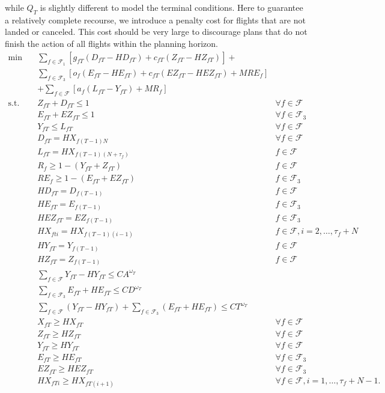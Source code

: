 \documentclass[12pt]{article}
\begin{document}
	while \(Q_T\) is slightly different to model the terminal conditions. Here to guarantee a relatively complete recourse, we introduce a penalty cost for flights that are not landed or canceled. This cost should be very large to discourage plans that do not finish the action of all flights within the planning horizon.
	\begin{subequations}
		\begin{align}
		\min \quad & \sum_{f \in \mathcal{F}_1} \left[ g_{fT} (D_{fT} - HD_{fT}) + c_{fT} (Z_{fT} - HZ_{fT}) \right] + & \nonumber \\
		& \sum_{f \in \mathcal{F}_3} \left[ o_f(E_{fT} - HE_{fT}) + c_{fT}(EZ_{fT} - HEZ_{fT}) + M RE_{f} \right]& \nonumber\\ 
		& +\sum_{f \in \mathcal{F}} \left[ a_f (L_{fT} - Y_{fT}) + M R_{f}\right]  &\\
		\text{s.t.} \quad & Z_{fT} + D_{fT} \leq 1 & \forall f \in \mathcal{F}\\
		& E_{fT} + EZ_{fT} \leq 1 & \forall f \in \mathcal{F}_3\\
		& Y_{fT} \leq L_{fT} & \forall f \in \mathcal{F}\\
		& D_{fT} = HX_{f(T-1)N} & \forall f \in \mathcal{F}\\
		& L_{fT} = HX_{f(T-1)(N+\tau_{f})}& f \in \mathcal{F}\\
		& R_f \geq 1 - (Y_{fT} + Z_{fT}) & f \in \mathcal{F}\\
		& RE_f \geq 1 - (E_{fT} + EZ_{fT}) & f \in \mathcal{F}_3\\
		& HD_{fT} = D_{f(T-1)} & f \in \mathcal{F}\\
		& HE_{fT} = E_{f(T-1)} & f \in \mathcal{F}_3\\
		& HEZ_{fT} = EZ_{f(T-1)} & f \in \mathcal{F}_3\\
		& HX_{fti} = HX_{f(T-1)(i-1)} & f \in \mathcal{F}, i = 2, \dots, \tau_{f} + N\\
		& HY_{fT} = Y_{f(T-1)} & f \in \mathcal{F}\\
		& HZ_{fT} = Z_{f(T-1)} & f \in \mathcal{F}\\
		& \sum_{f \in \mathcal{F}} Y_{fT} - HY_{fT} \leq CA^{\omega_T} &\\
		& \sum_{f \in \mathcal{F}_3} E_{fT} + HE_{fT} \leq CD^{\omega_T} &\\
		& \sum_{f \in \mathcal{F}} (Y_{fT} - HY_{fT}) + \sum_{f \in \mathcal{F}_3} (E_{fT} + HE_{fT}) \leq CT^{\omega_T} &\\
		& X_{fT} \geq HX_{fT} & \forall f \in \mathcal{F}\\
		& Z_{fT} \geq HZ_{fT} & \forall f \in \mathcal{F}\\
		& Y_{fT} \geq HY_{fT} & \forall f \in \mathcal{F}\\
		& E_{fT} \geq HE_{fT} & \forall f \in \mathcal{F}_3\\
		& EZ_{fT} \geq HEZ_{fT} & \forall f \in \mathcal{F}_3\\
		& HX_{fTi} \geq HX_{fT(i+1)} & \forall f \in \mathcal{F}, i = 1, \dots, \tau_{f} + N -1.
		\end{align}
	\end{subequations}
\end{document}
